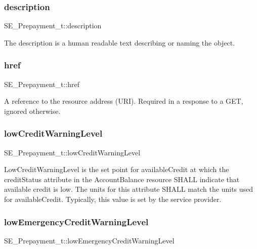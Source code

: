 \subsubsection{\texorpdfstring{description}{description}}
{\footnotesize\ttfamily S\+E\+\_\+\+Prepayment\+\_\+t\+::description}

The description is a human readable text describing or naming the object. \mbox{\label{group__Prepayment_gaa5be0767476c9086c9dfb595cf50d8cc}} 
\subsubsection{\texorpdfstring{href}{href}}
{\footnotesize\ttfamily S\+E\+\_\+\+Prepayment\+\_\+t\+::href}

A reference to the resource address (U\+RI). Required in a response to a G\+ET, ignored otherwise. \mbox{\label{group__Prepayment_ga1b2d199f5e15d28b29cd33d216328ef0}} 
\subsubsection{\texorpdfstring{low\+Credit\+Warning\+Level}{lowCreditWarningLevel}}
{\footnotesize\ttfamily S\+E\+\_\+\+Prepayment\+\_\+t\+::low\+Credit\+Warning\+Level}

Low\+Credit\+Warning\+Level is the set point for available\+Credit at which the credit\+Status attribute in the Account\+Balance resource S\+H\+A\+LL indicate that available credit is low. The units for this attribute S\+H\+A\+LL match the units used for available\+Credit. Typically, this value is set by the service provider. \mbox{\label{group__Prepayment_gae5fc43fad2c5429a124db67195f94acb}} 
\subsubsection{\texorpdfstring{low\+Emergency\+Credit\+Warning\+Level}{lowEmergencyCreditWarningLevel}}
{\footnotesize\ttfamily S\+E\+\_\+\+Prepayment\+\_\+t\+::low\+Emergency\+Credit\+Warning\+Level}

